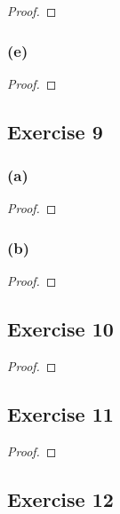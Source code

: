 \documentclass[14pt]{extarticle}
\begin{document}
\begin{proof}

\end{proof}

\subsubsection{(e)}

\begin{proof}

\end{proof}

\subsection{Exercise 9}

\subsubsection{(a)}

\begin{proof}

\end{proof}

\subsubsection{(b)}

\begin{proof}

\end{proof}

\subsection{Exercise 10}

\begin{proof}

\end{proof}

\subsection{Exercise 11}

\begin{proof}

\end{proof}

\subsection{Exercise 12}
\end{document}
